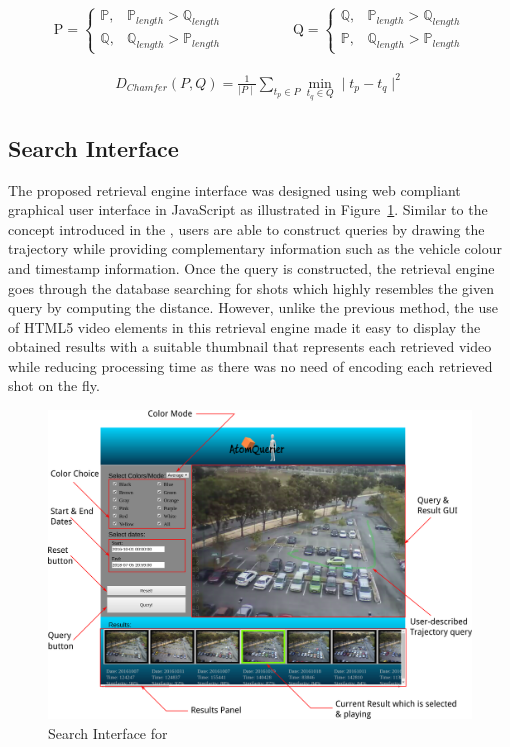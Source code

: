 \begin{align}
\mathrm{P} =\begin{cases}
\mathbb{P}, & \mathbb{P}_{length} > \mathbb{Q}_{length} \\
\mathbb{Q}, & \mathbb{Q}_{length} > \mathbb{P}_{length}
\end{cases}   \hspace{2em}  &  \hspace{2em}
\mathrm{Q} =\begin{cases}
\mathbb{Q}, & \mathbb{P}_{length} > \mathbb{Q}_{length} \\
\mathbb{P}, & \mathbb{Q}_{length} > \mathbb{P}_{length}
\end{cases}
\end{align}


\begin{align}
\label{eq:chamferDistance}
D_{Chamfer} (P,Q) = \frac{1}{\mid P \mid} \sum_{t_p \in P} \min_{t_q \in Q}  \mid t_p - t_q \mid^{2}
\end{align}

\subsection{Search Interface}
The proposed retrieval engine interface was designed using web compliant
graphical user interface in JavaScript as illustrated in Figure~\ref{fig:versionTwoInterface}.
Similar to the concept introduced in the \versionOneRet, users are able to
construct queries by drawing the trajectory while providing complementary
information such as the vehicle colour and timestamp information.
Once the query is constructed, the retrieval engine goes through the database
searching for shots which highly resembles the given query by computing the
distance.
However, unlike the previous method, the use of HTML5 video elements in this
retrieval engine made it easy to display the obtained results with a suitable
thumbnail that represents each retrieved video while reducing processing time
as there was no need of encoding each retrieved shot on the fly.

\begin{figure}[!hbt]\centering
\includegraphics[width=.9\textwidth]{image/retrievalTwo/VISERinterface2.png}
\caption{Search Interface for \versionTwoRet}
\label{fig:versionTwoInterface}
\end{figure}


